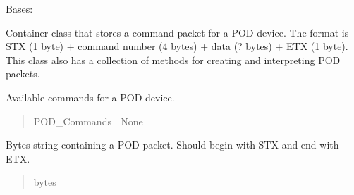 \documentclass[letterpaper,10pt,english]{sphinxmanual}
\begin{document}
\begin{fulllineitems}
\label{\detokenize{Morelia.Packets:Morelia.Packets.Packet.Packet}}
\pysigstartsignatures
{}
\pysigstopsignatures
\sphinxAtStartPar
Bases: 

\sphinxAtStartPar
Container class that stores a command packet for a POD device. The format is     STX (1 byte) + command number (4 bytes) + data (? bytes) + ETX (1 byte). This class     also has a collection of methods for creating and interpreting POD packets.

\begin{fulllineitems}
\label{\detokenize{Morelia.Packets:Morelia.Packets.Packet.Packet._commands}}
\pysigstartsignatures
{}
\pysigstopsignatures
\sphinxAtStartPar
Available commands for a POD device.
\begin{quote}\begin{description}
\sphinxAtStartPar
POD\_Commands | None

\end{description}\end{quote}

\end{fulllineitems}


\begin{fulllineitems}
\label{\detokenize{Morelia.Packets:Morelia.Packets.Packet.Packet.rawPacket}}
\pysigstartsignatures
{}
\pysigstopsignatures
\sphinxAtStartPar
Bytes string containing a POD packet. Should begin with             STX and end with ETX.
\begin{quote}\begin{description}
\sphinxAtStartPar
bytes


\end{description}
\end{quote}
\end{fulllineitems}
\end{fulllineitems}
\end{document}
